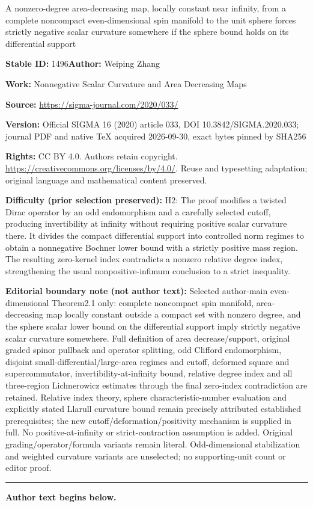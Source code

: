 \documentclass[11pt]{article}
\numberwithin{equation}{section}
\numberwithin{equation}{section}
\theoremstyle{definition}
\begin{document}
\begin{center}\Large A nonzero-degree area-decreasing map, locally constant near infinity, from a complete noncompact even-dimensional spin manifold to the unit sphere forces strictly negative scalar curvature somewhere if the sphere bound holds on its differential support\end{center}
\noindent\textbf{Stable ID:} 1496\quad\textbf{Author:} Weiping Zhang\par
\noindent\textbf{Work:} Nonnegative Scalar Curvature and Area Decreasing Maps\par
\noindent\textbf{Source:} \url{https://sigma-journal.com/2020/033/}\par
\noindent\textbf{Version:} Official SIGMA 16 (2020) article 033, DOI 10.3842/SIGMA.2020.033; journal PDF and native TeX acquired 2026-09-30, exact bytes pinned by SHA256\par
\noindent\textbf{Rights:} CC BY 4.0. Authors retain copyright. \url{https://creativecommons.org/licenses/by/4.0/}. Reuse and typesetting adaptation; original language and mathematical content preserved.\par
\noindent\textbf{Difficulty (prior selection preserved):} {\CJKfont H2: The proof modifies a twisted Dirac operator by an odd endomorphism and a carefully selected cutoff, producing invertibility at infinity without requiring positive scalar curvature there. It divides the compact differential support into controlled norm regimes to obtain a nonnegative Bochner lower bound with a strictly positive mass region. The resulting zero-kernel index contradicts a nonzero relative degree index, strengthening the usual nonpositive-infimum conclusion to a strict inequality.}\par
\medskip\noindent\textbf{Editorial boundary note (not author text):} Selected author-main even-dimensional Theorem2.1 only: complete noncompact spin manifold, area-decreasing map locally constant outside a compact set with nonzero degree, and the sphere scalar lower bound on the differential support imply strictly negative scalar curvature somewhere. Full definition of area decrease/support, original graded spinor pullback and operator splitting, odd Clifford endomorphism, disjoint small-differential/large-area regimes and cutoff, deformed square and supercommutator, invertibility-at-infinity bound, relative degree index and all three-region Lichnerowicz estimates through the final zero-index contradiction are retained. Relative index theory, sphere characteristic-number evaluation and explicitly stated Llarull curvature bound remain precisely attributed established prerequisites; the new cutoff/deformation/positivity mechanism is supplied in full. No positive-at-infinity or strict-contraction assumption is added. Original grading/operator/formula variants remain literal. Odd-dimensional stabilization and weighted curvature variants are unselected; no supporting-unit count or editor proof.\par
\medskip\hrule\medskip\noindent\textbf{Author text begins below.}\par
\end{document}
